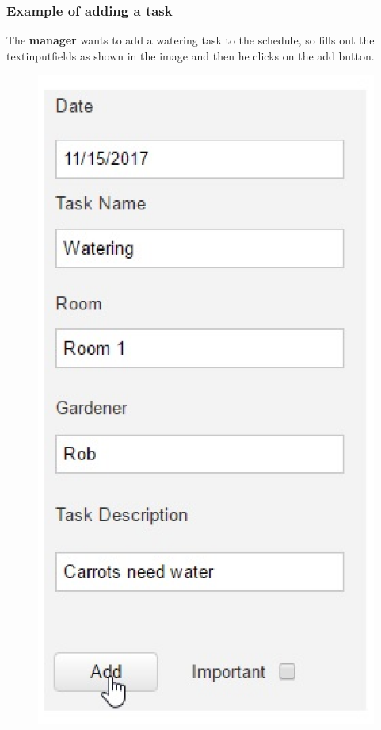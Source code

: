 \subsubsection{Example of adding a task}
The \textbf{manager} wants to add a watering task to the schedule, so fills out
the textinputfields as shown in the image and then he clicks on the add button.
\begin{figure}[h]
\includegraphics[width=1\textwidth]{images/addingTaskGardener.eps}
\end{figure}


